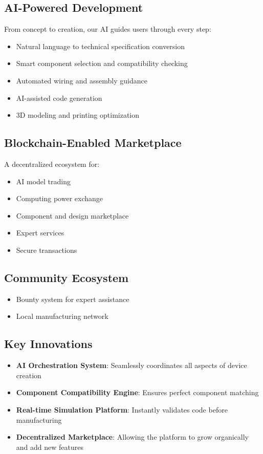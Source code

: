 \subsection{AI-Powered Development}
From concept to creation, our AI guides users through every step:
\begin{itemize}[leftmargin=*]
    \item Natural language to technical specification conversion
    \item Smart component selection and compatibility checking
    \item Automated wiring and assembly guidance
    \item AI-assisted code generation
    \item 3D modeling and printing optimization
\end{itemize}

\subsection{Blockchain-Enabled Marketplace}
A decentralized ecosystem for:
\begin{itemize}[leftmargin=*]
    \item AI model trading
    \item Computing power exchange
    \item Component and design marketplace
    \item Expert services
    \item Secure transactions
\end{itemize}

\subsection{Community Ecosystem}
\begin{itemize}[leftmargin=*]
    \item Bounty system for expert assistance
    \item Local manufacturing network
\end{itemize}

\subsection{Key Innovations}
\begin{itemize}[leftmargin=*]
    \item \textbf{AI Orchestration System}: Seamlessly coordinates all aspects of device creation
    \item \textbf{Component Compatibility Engine}: Ensures perfect component matching
    \item \textbf{Real-time Simulation Platform}: Instantly validates code before manufacturing
    \item \textbf{Decentralized Marketplace}: Allowing the platform to grow organically and add new features
\end{itemize} 